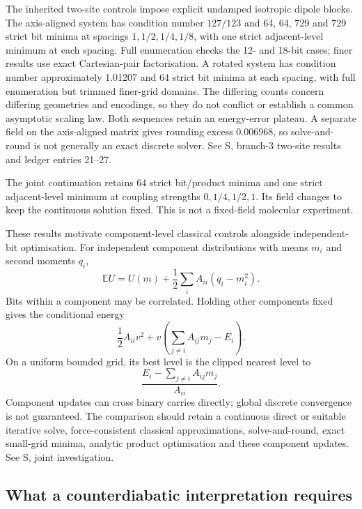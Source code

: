 \documentclass{article}
\begin{document}
The inherited two-site controls impose explicit undamped isotropic dipole blocks. The axis-aligned system has condition number $127/123$ and 64, 64, 729 and 729 strict bit minima at spacings $1,1/2,1/4,1/8$, with one strict adjacent-level minimum at each spacing. Full enumeration checks the 12- and 18-bit cases; finer results use exact Cartesian-pair factorisation. A rotated system has condition number approximately 1.01207 and 64 strict bit minima at each spacing, with full enumeration but trimmed finer-grid domains. The differing counts concern differing geometries and encodings, so they do not conflict or establish a common asymptotic scaling law. Both sequences retain an energy-error plateau. A separate field on the axis-aligned matrix gives rounding excess $0.006968$, so solve-and-round is not generally an exact discrete solver. See S, branch-3 two-site results and ledger entries 21--27.

The joint continuation retains 64 strict bit/product minima and one strict adjacent-level minimum at coupling strengths $0,1/4,1/2,1$. Its field changes to keep the continuous solution fixed. This is not a fixed-field molecular experiment.

These results motivate component-level classical controls alongside independent-bit optimisation. For independent component distributions with means $m_i$ and second moments $q_i$,
\begin{equation}
\mathbb E U=U(m)+\frac12\sum_i A_{ii}(q_i-m_i^2).
\end{equation}
Bits within a component may be correlated. Holding other components fixed gives the conditional energy
\begin{equation}
\frac12 A_{ii}v^2+v\left(\sum_{j\neq i}A_{ij}m_j-E_i\right).
\end{equation}
On a uniform bounded grid, its best level is the clipped nearest level to
\begin{equation}
\frac{E_i-\sum_{j\neq i}A_{ij}m_j}{A_{ii}}.
\end{equation}
Component updates can cross binary carries directly; global discrete convergence is not guaranteed. The comparison should retain a continuous direct or suitable iterative solve, force-consistent classical approximations, solve-and-round, exact small-grid minima, analytic product optimisation and these component updates. See S, joint investigation.

\subsection{What a counterdiabatic interpretation requires}
\end{document}
